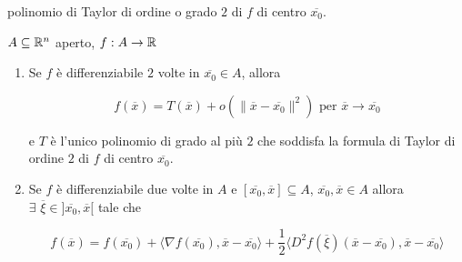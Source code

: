 polinomio di Taylor di ordine o grado $2$ di $f$ di centro $\overline{x_0}$.


\begin{theorem}
	
	\label{th: pag 377}
	$A \subseteq \mathbb{R}^n$ aperto, $f: A \rightarrow \mathbb{R}$
	\begin{enumerate}
		\item Se $f$ è differenziabile $2$ volte in $\overline{x_0} \in A$, allora
		
		\begin{equation}
			\label{eq: pag 377}
			f(\overline{x})=T(\overline{x})+o(\|\overline{x}-\overline{x_0}\|^2) \text{ per } \overline{x}\rightarrow \overline{x_0}
		\end{equation}
		
		e $T$ è l'unico polinomio di grado al più $2$ che soddisfa la formula di Taylor di ordine $2$ di $f$ di centro $\overline{x_0}$.
		
		\item Se $f$ è differenziabile due volte in $A$ e $[\overline{x_0},\overline{x}]\subseteq A$, $\overline{x_0},\overline{x}\in A$ allora $ \exists\,\, \overline{\xi}\in ]\overline{x_0},\overline{x}[$ tale che
		
		$$f(\overline{x})=f(\overline{x_0})+\langle \nabla f(\overline{x_0}),\overline{x} -\overline{x_0}\rangle +\frac{1}{2}\langle D^2 f(\overline{\xi})(\overline{x}-\overline{x_0}),\overline{x}-\overline{x_0} \rangle$$
	\end{enumerate} 
\end{theorem}


